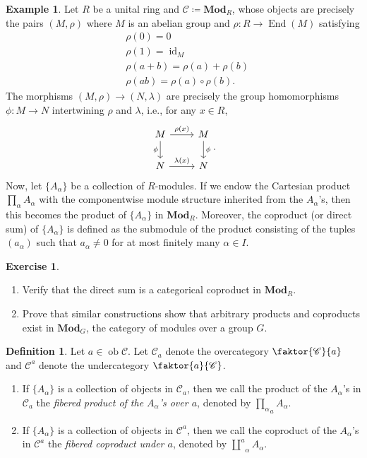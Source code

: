 \documentclass[10pt,letterpaper,cm]{nupset}
\theoremstyle{definition}
\newtheorem*{definition}{Definition}
\newtheorem{exmp}{Example}
\newtheorem{exercise}{Exercise}
\newcommand{\1}{\mathbf{1}}
\renewcommand{\c}{\mathscr{C}}
\newcommand{\0}{\vec 0}
\DeclareMathOperator{\id}{id}
\DeclareMathOperator{\ed}{End}
\DeclareMathOperator{\ob}{ob}
\begin{document}
\begin{exmp} 
Let $R$ be a unital ring and $\c \coloneqq  \mathbf{Mod}_R$, whose objects are precisely the pairs $(M, \rho)$ where $M$ is an abelian group and $\rho : R \to \ed(M)$ satisfying 
\begin{align*} & \rho(0) = 0  \\ & \rho(1) = \id_M \\  & \rho(a +b) = \rho(a) + \rho(b)  \\ & \rho(ab) = \rho(a) \circ \rho(b). \end{align*} The morphisms $(M, \rho) \to (N, \lambda)$ are precisely the group homomorphisms $\phi : M \to N$ intertwining $\rho$ and $\lambda$, i.e., for any $x \in R$,
\[
\begin{tikzcd}
M \arrow[d, "\phi"'] \arrow[r, "\rho(x)"] & M \arrow[d, "\phi"] \\
N \arrow[r, "\lambda(x)"] & N
\end{tikzcd}.
\]
Now, let $\{A_{\alpha}\}$ be a collection of $R$-modules. If we endow the Cartesian product $\prod_{\alpha} A_{\alpha}$ with the componentwise module structure inherited from the $A_{\alpha}$'s, then this becomes the product of $\{A_{\alpha}\}$ in $\mathbf{Mod}_R$. Moreover, the coproduct (or direct sum) of $\{A_{\alpha}\}$ is defined as the submodule of the product consisting of the tuples $(a_{\alpha})$ such that $a_{\alpha} \ne 0$ for at most finitely many $\alpha \in I$.
\begin{exercise} $ $
\begin{enumerate}
\item Verify that the direct sum is a categorical coproduct in $\mathbf{Mod}_R$.
\item Prove that similar constructions show that arbitrary products and coproducts exist in $\mathbf{Mod}_G$, the category of modules over a group $G$.
\end{enumerate}
\end{exercise}
\end{exmp}

\begin{definition} Let $a \in \ob \c$. Let $\c_a$ denote the overcategory $\faktor{\c}{a}$ and $\c^a$ denote the undercategory $\faktor{a}{\c}$. 
\begin{enumerate}
\item If $\{A_{\alpha}\}$ is a collection of objects in $\c_a$, then we call the product of the $A_{\alpha}$'s in $\c_a$ the \textit{fibered product of the $A_{\alpha}$'s over $a$}, denoted by $\underset{a}{\prod_{\alpha}} A_{\alpha}$.
\item If $\{A_{\alpha}\}$ is a collection of objects in $\c^a$, then we call the coproduct of the $A_{\alpha}$'s in $\c^a$ the \textit{fibered coproduct under $a$}, denoted by $\overset{a}{\coprod}_{\alpha}A_{\alpha}$.
\end{enumerate}
\end{definition}
\end{document}
